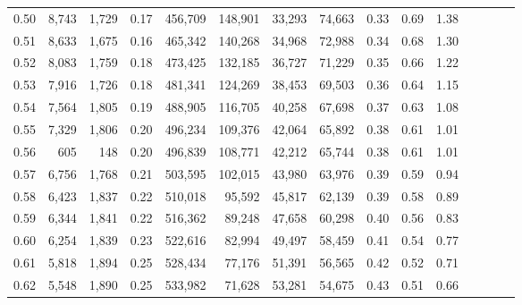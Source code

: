 \begin{tabular}{rrrcrrrrrrrrrrr}
0.50 &   8,743 &  1,729 &                                       0.17 &  456,709 &  148,901 &   33,293 &   74,663 &  0.33 &  0.69 &                         1.38 \\
0.51 &   8,633 &  1,675 &                                       0.16 &  465,342 &  140,268 &   34,968 &   72,988 &  0.34 &  0.68 &                         1.30 \\
0.52 &   8,083 &  1,759 &                                       0.18 &  473,425 &  132,185 &   36,727 &   71,229 &  0.35 &  0.66 &                         1.22 \\
0.53 &   7,916 &  1,726 &                                       0.18 &  481,341 &  124,269 &   38,453 &   69,503 &  0.36 &  0.64 &                         1.15 \\
0.54 &   7,564 &  1,805 &                                       0.19 &  488,905 &  116,705 &   40,258 &   67,698 &  0.37 &  0.63 &                         1.08 \\
0.55 &   7,329 &  1,806 &                                       0.20 &  496,234 &  109,376 &   42,064 &   65,892 &  0.38 &  0.61 &                         1.01 \\
0.56 &     605 &    148 &                                       0.20 &  496,839 &  108,771 &   42,212 &   65,744 &  0.38 &  0.61 &                         1.01 \\
0.57 &   6,756 &  1,768 &                                       0.21 &  503,595 &  102,015 &   43,980 &   63,976 &  0.39 &  0.59 &                         0.94 \\
0.58 &   6,423 &  1,837 &                                       0.22 &  510,018 &   95,592 &   45,817 &   62,139 &  0.39 &  0.58 &                         0.89 \\
0.59 &   6,344 &  1,841 &                                       0.22 &  516,362 &   89,248 &   47,658 &   60,298 &  0.40 &  0.56 &                         0.83 \\
0.60 &   6,254 &  1,839 &                                       0.23 &  522,616 &   82,994 &   49,497 &   58,459 &  0.41 &  0.54 &                         0.77 \\
0.61 &   5,818 &  1,894 &                                       0.25 &  528,434 &   77,176 &   51,391 &   56,565 &  0.42 &  0.52 &                         0.71 \\
0.62 &   5,548 &  1,890 &                                       0.25 &  533,982 &   71,628 &   53,281 &   54,675 &  0.43 &  0.51 &                         0.66 \\

\end{tabular}
